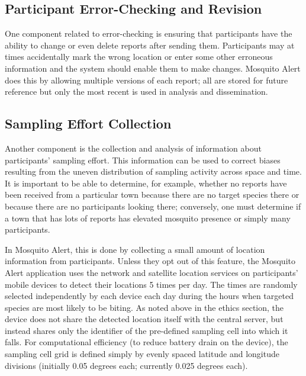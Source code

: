 \documentclass[]{article}
\begin{document}
\hypertarget{participant-error-checking-and-revision}{%
\subsection{Participant Error-Checking and Revision}\label{participant-error-checking-and-revision}}

One component related to error-checking is ensuring that participants have the ability to change or even delete reports after sending them. Participants may at times accidentally mark the wrong location or enter some other erroneous information and the system should enable them to make changes. Mosquito Alert does this by allowing multiple versions of each report; all are stored for future reference but only the most recent is used in analysis and dissemination.

\hypertarget{sampling-effort-collection}{%
\subsection{Sampling Effort Collection}\label{sampling-effort-collection}}

Another component is the collection and analysis of information about participants' sampling effort. This information can be used to correct biases resulting from the uneven distribution of sampling activity across space and time. It is important to be able to determine, for example, whether no reports have been received from a particular town because there are no target species there or because there are no participants looking there; conversely, one must determine if a town that has lots of reports has elevated mosquito presence or simply many participants.

In Mosquito Alert, this is done by collecting a small amount of location information from participants. Unless they opt out of this feature, the Mosquito Alert application uses the network and satellite location services on participants' mobile devices to detect their locations 5 times per day. The times are randomly selected independently by each device each day during the hours when targeted species are most likely to be biting. As noted above in the ethics section, the device does not share the detected location itself with the central server, but instead shares only the identifier of the pre-defined sampling cell into which it falls. For computational efficiency (to reduce battery drain on the device), the sampling cell grid is defined simply by evenly spaced latitude and longitude divisions (initially 0.05 degrees each; currently 0.025 degrees each).
\end{document}
